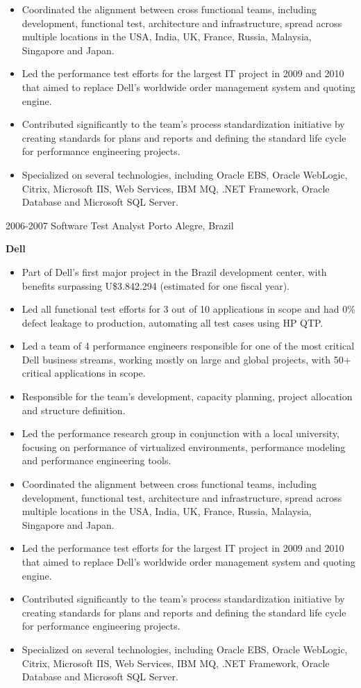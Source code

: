 \begin{entrylist}
{\begin{itemize}
        \item Coordinated the alignment between cross functional teams, including development, functional test, architecture and infrastructure, spread across multiple locations  in the USA, India, UK, France, Russia, Malaysia, Singapore and Japan.
        \item Led the performance test efforts for the largest IT project in 2009 and 2010 that aimed to replace Dell’s worldwide order management system and quoting engine.
        \item Contributed significantly to the team’s process standardization initiative by creating standards for plans and reports and defining the standard life cycle for performance engineering projects.
        \item Specialized on several technologies, including Oracle EBS, Oracle WebLogic, Citrix, Microsoft IIS, Web Services, IBM MQ, .NET Framework, Oracle Database and Microsoft SQL Server.
      \end{itemize}
    }
  \entry
    {2006-2007}
    {Software Test Analyst}
    {Porto Alegre, Brazil}
    {
      \textbf{Dell}
      \begin{itemize}
        \item Part of Dell’s first major project in the Brazil development center, with benefits surpassing U\$3.842.294 (estimated for one fiscal year).
        \item Led all functional test efforts for 3 out of 10 applications in scope and had 0\% defect leakage to production, automating all test cases using HP QTP.
        \item Led a team of 4 performance engineers responsible for one of the most critical Dell business streams, working mostly on large and global projects, with 50+ critical applications in scope.
        \item Responsible for the team’s development, capacity planning, project allocation and structure definition.
        \item Led the performance research group in conjunction with a local university, focusing on performance of virtualized environments, performance modeling and performance engineering tools.
        \item Coordinated the alignment between cross functional teams, including development, functional test, architecture and infrastructure, spread across multiple locations  in the USA, India, UK, France, Russia, Malaysia, Singapore and Japan.
        \item Led the performance test efforts for the largest IT project in 2009 and 2010 that aimed to replace Dell’s worldwide order management system and quoting engine.
        \item Contributed significantly to the team’s process standardization initiative by creating standards for plans and reports and defining the standard life cycle for performance engineering projects.
        \item Specialized on several technologies, including Oracle EBS, Oracle WebLogic, Citrix, Microsoft IIS, Web Services, IBM MQ, .NET Framework, Oracle Database and Microsoft SQL Server.
      \end{itemize}
    }
\end{entrylist}
